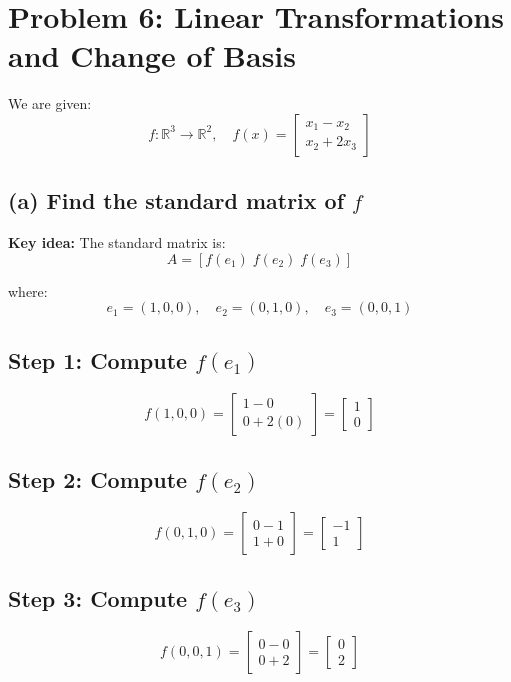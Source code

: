 \documentclass[11pt]{article}
\begin{document}
\hrulefill

\section*{Problem 6: Linear Transformations and Change of Basis}

We are given:
\[
f : \mathbb{R}^3 \to \mathbb{R}^2,\quad
f(x) =
\begin{bmatrix}
x_1 - x_2 \\
x_2 + 2x_3
\end{bmatrix}
\]

\subsection*{(a) Find the standard matrix of $f$}

\textbf{Key idea:}
The standard matrix is:
\[
A = [f(e_1)\; f(e_2)\; f(e_3)]
\]

where:
\[
e_1 = (1,0,0),\quad e_2 = (0,1,0),\quad e_3 = (0,0,1)
\]

\subsection*{Step 1: Compute $f(e_1)$}

\[
f(1,0,0) =
\begin{bmatrix}
1 - 0 \\
0 + 2(0)
\end{bmatrix}
=
\begin{bmatrix}
1 \\
0
\end{bmatrix}
\]

\subsection*{Step 2: Compute $f(e_2)$}

\[
f(0,1,0) =
\begin{bmatrix}
0 - 1 \\
1 + 0
\end{bmatrix}
=
\begin{bmatrix}
-1 \\
1
\end{bmatrix}
\]

\subsection*{Step 3: Compute $f(e_3)$}

\[
f(0,0,1) =
\begin{bmatrix}
0 - 0 \\
0 + 2
\end{bmatrix}
=
\begin{bmatrix}
0 \\
2
\end{bmatrix}
\]
\end{document}
